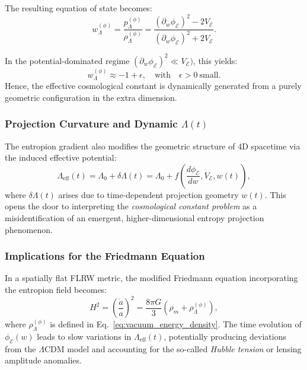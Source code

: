 \documentclass[12pt]{article}
\begin{document}
The resulting equation of state becomes:
\begin{equation}
\label{eq:eos_entropion}
w_{\Lambda}^{(\phi)} = \frac{p_{\Lambda}^{(\phi)}}{\rho_{\Lambda}^{(\phi)}} = \frac{(\partial_w \phi_{\mathcal{E}})^2 - 2V_{\mathcal{E}}}{(\partial_w \phi_{\mathcal{E}})^2 + 2V_{\mathcal{E}}}.
\end{equation}

In the potential-dominated regime \((\partial_w \phi_{\mathcal{E}})^2 \ll V_{\mathcal{E}})\), this yields:
\begin{equation}
\label{eq:limit_eos}
w_{\Lambda}^{(\phi)} \approx -1 + \epsilon, \quad \text{with} \quad \epsilon > 0 \ \text{small}.
\end{equation}
Hence, the effective cosmological constant is dynamically generated from a purely geometric configuration in the extra dimension.

\subsubsection*{Projection Curvature and Dynamic \(\Lambda(t)\)}

The entropion gradient also modifies the geometric structure of 4D spacetime via the induced effective potential:
\begin{equation}
\label{eq:lambda_entropion}
\Lambda_{\text{eff}}(t) = \Lambda_0 + \delta \Lambda(t) = \Lambda_0 + f\left( \frac{d\phi_{\mathcal{E}}}{dw}, V_{\mathcal{E}}, w(t) \right),
\end{equation}
where \(\delta \Lambda(t)\) arises due to time-dependent projection geometry \(w(t)\). This opens the door to interpreting the \emph{cosmological constant problem} as a misidentification of an emergent, higher-dimensional entropy projection phenomenon.

\subsubsection*{Implications for the Friedmann Equation}

In a spatially flat FLRW metric, the modified Friedmann equation incorporating the entropion field becomes:
\begin{equation}
\label{eq:friedmann_with_entropion}
H^2 = \left( \frac{\dot{a}}{a} \right)^2 = \frac{8\pi G}{3} \left( \rho_m + \rho_{\Lambda}^{(\phi)} \right),
\end{equation}
where \(\rho_{\Lambda}^{(\phi)}\) is defined in Eq.~\eqref{eq:vacuum_energy_density}. The time evolution of \(\phi_{\mathcal{E}}(w)\) leads to slow variations in \(\Lambda_{\text{eff}}(t)\), potentially producing deviations from the \(\Lambda\)CDM model and accounting for the so-called \emph{Hubble tension} or lensing amplitude anomalies.
\end{document}
